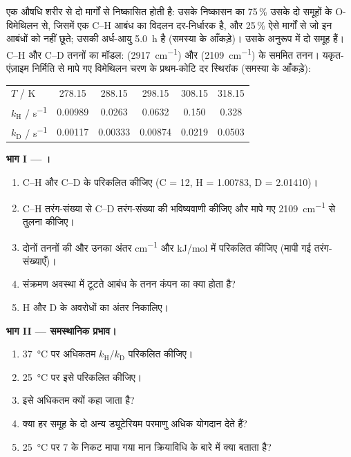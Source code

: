 \begin{problem}
\label{pb:b3:rate-theories:1}
एक औषधि शरीर से दो मार्गों से निष्कासित होती है: उसके निष्कासन का 75\,\% उसके दो 
समूहों के O-विमेथिलन से, जिसमें एक C--H आबंध का विदलन
दर-निर्धारक है, और 25\,\% ऐसे मार्गों से जो इन आबंधों को नहीं छूते; उसकी
अर्ध-आयु \qty{5.0}{h} है (समस्या के आँकड़े)। उसके अनुरूप में दो 
समूह हैं। C--H और C--D तननों का मॉडल: 
(\qty{2917}{cm^{-1}}) और  (\qty{2109}{cm^{-1}}) के सममित तनन। यकृत-एंज़ाइम निर्मिति से मापे गए
विमेथिलन चरण के प्रथम-कोटि दर स्थिरांक (समस्या के
आँकड़े):
\begin{center}\small
\begin{tabular}{lccccc}
\hline
$T$ / K & 278.15 & 288.15 & 298.15 & 308.15 & 318.15 \\
$k_{\mathrm H}$ / \unit{s^{-1}} & 0.00989 & 0.0263 & 0.0632 & 0.150 & 0.328 \\
$k_{\mathrm D}$ / \unit{s^{-1}} & 0.00117 & 0.00333 & 0.00874 & 0.0219 & 0.0503 \\ \hline
\end{tabular}
\end{center}

\medskip\noindent\textbf{भाग I --- ।}
\begin{enumerate}
  \item C--H और C--D के  परिकलित कीजिए (C = 12, H = 1.00783,
        D = 2.01410)।
  \item C--H तरंग-संख्या से C--D तरंग-संख्या की भविष्यवाणी कीजिए और मापे गए
        \qty{2109}{cm^{-1}} से तुलना कीजिए।
  \item दोनों तननों की  और उनका
        अंतर \unit{cm^{-1}} और \unit{kJ/mol} में परिकलित कीजिए (मापी गई तरंग-संख्याएँ)।
  \item संक्रमण अवस्था में टूटते आबंध के तनन कंपन का क्या होता है?
  \item H और D के अवरोधों का अंतर निकालिए।
\end{enumerate}

\medskip\noindent\textbf{भाग II --- समस्थानिक प्रभाव।}
\begin{enumerate}[resume]
  \item \qty{37}{\celsius} पर अधिकतम $k_{\mathrm H}/k_{\mathrm D}$ परिकलित कीजिए।
  \item \qty{25}{\celsius} पर इसे परिकलित कीजिए।
  \item इसे अधिकतम क्यों कहा जाता है?
  \item क्या हर  समूह के दो अन्य ड्यूटेरियम परमाणु अधिक योगदान देते हैं?
  \item \qty{25}{\celsius} पर 7 के निकट मापा गया मान क्रियाविधि के बारे में
        क्या बताता है?
\end{enumerate}


\end{problem}
